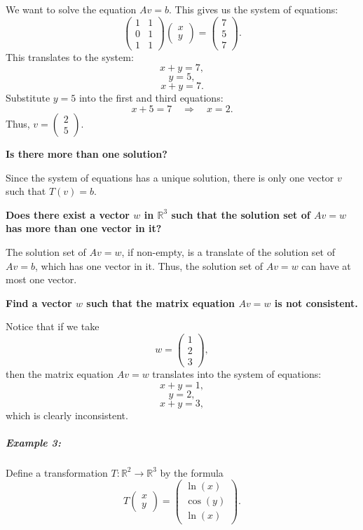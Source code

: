 \documentclass[a4paper,12pt]{article}
\begin{document}
We want to solve the equation \( Av = b \). This gives us the system of equations:
\[
\begin{pmatrix} 1 & 1 \\ 0 & 1 \\ 1 & 1 \end{pmatrix} \begin{pmatrix} x \\ y \end{pmatrix} = \begin{pmatrix} 7 \\ 5 \\ 7 \end{pmatrix}.
\]
This translates to the system:
\[
x + y = 7,
\]
\[
y = 5,
\]
\[
x + y = 7.
\]
Substitute \( y = 5 \) into the first and third equations:
\[
x + 5 = 7 \quad \Rightarrow \quad x = 2.
\]
Thus, \( v = \begin{pmatrix} 2 \\ 5 \end{pmatrix} \).

\textbf{Is there more than one solution?}

Since the system of equations has a unique solution, there is only one vector \( v \) such that \( T(v) = b \).

\textbf{Does there exist a vector \( w \) in \( \mathbb{R}^3 \) such that the solution set of \( Av = w \) has more than one vector in it?}

The solution set of \( Av = w \), if non-empty, is a translate of the solution set of \( Av = b \), which has one vector in it. Thus, the solution set of \( Av = w \) can have at most one vector.

\textbf{Find a vector \( w \) such that the matrix equation \( Av = w \) is not consistent.}

Notice that if we take
\[
w = \begin{pmatrix} 1 \\ 2 \\ 3 \end{pmatrix},
\]
then the matrix equation \( Av = w \) translates into the system of equations:
\[
x + y = 1,
\]
\[
y = 2,
\]
\[
x + y = 3,
\]
which is clearly inconsistent.

\subparagraph{Example 3:}

Define a transformation \( T: \mathbb{R}^2 \to \mathbb{R}^3 \) by the formula
\[
T\begin{pmatrix} x \\ y \end{pmatrix} = \begin{pmatrix} \ln(x) \\ \cos(y) \\ \ln(x) \end{pmatrix}.
\]
\end{document}
